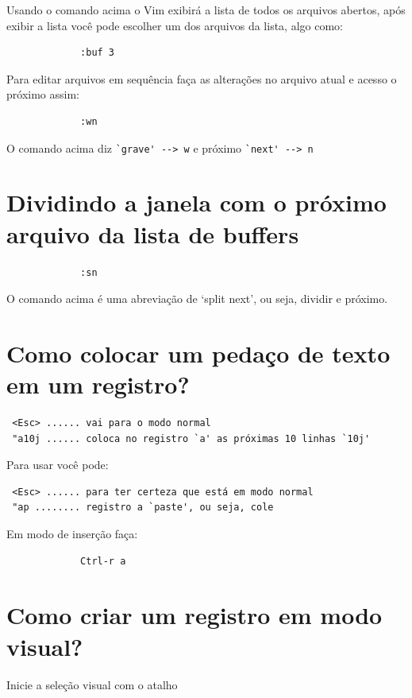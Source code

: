 \documentclass[10pt,a4paper,openany]{book}
\begin{document}
Usando o comando acima o Vim exibirá a lista de todos os arquivos
abertos, após exibir a lista você pode escolher um dos arquivos da
lista, algo como:

\begin{verbatim}
			 :buf 3
\end{verbatim}

Para editar arquivos em sequência faça as alterações no arquivo atual
e acesso o próximo assim:

\begin{verbatim}
			 :wn
\end{verbatim}

O comando acima diz \verb|`grave' --> w|  e próximo \verb|`next' --> n|

\section{Dividindo a janela com o próximo arquivo da lista de buffers}
\label{Dividindo a janela com o próximo arquivo da lista de buffers}

\begin{verbatim}
			 :sn
\end{verbatim}

O comando acima é uma abreviação de `split next', ou seja, dividir e próximo.

\section{Como colocar um pedaço de texto em um registro?}
\label{Como colocar um pedaço de texto em um registro?}

\begin{verbatim}
 <Esc> ...... vai para o modo normal
 "a10j ...... coloca no registro `a' as próximas 10 linhas `10j'
\end{verbatim}

Para usar você pode:

\begin{verbatim}
 <Esc> ...... para ter certeza que está em modo normal
 "ap ........ registro a `paste', ou seja, cole
\end{verbatim}

Em modo de inserção faça:

\begin{verbatim}
			 Ctrl-r a
\end{verbatim}

\section{Como criar um registro em modo visual?}
\label{Como criar um registro em modo visual?}
Inicie a seleção visual com o atalho
\end{document}
